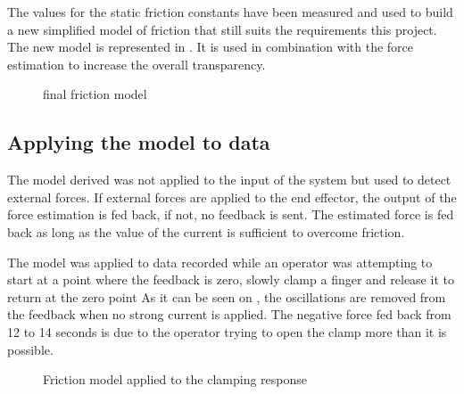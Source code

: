 The values for the static friction constants have been measured and used to build a new simplified model of friction that still suits the requirements this project. The new model is represented in . It is used in combination with the force estimation to increase the overall transparency.

\begin{figure}[h]
\centering
\caption{final friction model}
\label{fig:new_friction_model}
\end{figure}

\subsection{Applying the model to data}

The model derived was not applied to the input of the system but used to detect external forces. If external forces are applied to the end effector, the output of the force estimation is fed back, if not, no feedback is sent. The estimated force is fed back as long as the value of the current is sufficient to overcome friction.

The model was applied to data recorded while an operator was attempting to start at a point where the feedback is zero, slowly clamp a finger and release it to return at the zero point
As it can be seen on , the oscillations are removed from the feedback when no strong current is applied. The negative force fed back from 12 to 14 seconds is due to the operator trying to open the clamp more than it is possible. 
\begin{figure}[H]

\caption{Friction model applied to the clamping response}
\label{fig:friction_validation}
\end{figure}

